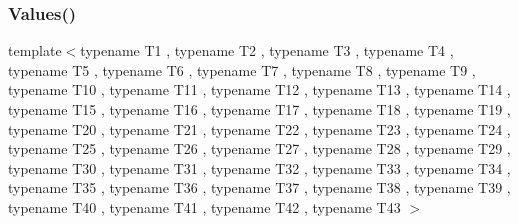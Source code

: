 \mbox{\label{namespacetesting_a316b2e13e635215ac89a50315bb66d81}} 
\subsubsection{\texorpdfstring{Values()}{Values()}\hspace{0.1cm}{\footnotesize\ttfamily [43/50]}}
{\footnotesize\ttfamily template$<$typename T1 , typename T2 , typename T3 , typename T4 , typename T5 , typename T6 , typename T7 , typename T8 , typename T9 , typename T10 , typename T11 , typename T12 , typename T13 , typename T14 , typename T15 , typename T16 , typename T17 , typename T18 , typename T19 , typename T20 , typename T21 , typename T22 , typename T23 , typename T24 , typename T25 , typename T26 , typename T27 , typename T28 , typename T29 , typename T30 , typename T31 , typename T32 , typename T33 , typename T34 , typename T35 , typename T36 , typename T37 , typename T38 , typename T39 , typename T40 , typename T41 , typename T42 , typename T43 $>$ \\
}
